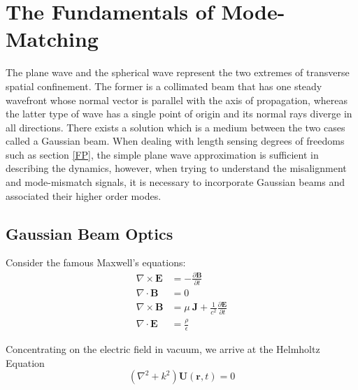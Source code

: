 \chapter{The Fundamentals of Mode-Matching}\label{fund_mm}
	  The plane wave and the spherical wave represent the two extremes of transverse spatial confinement. The former is a collimated beam that has one steady wavefront whose normal vector is parallel with the axis of propagation, whereas the latter type of wave has a single point of origin and its normal rays diverge in all directions.  There exists a solution which is a medium between the two cases called a Gaussian beam.  When dealing with length sensing degrees of freedoms such as section \ref{FP}, the simple plane wave approximation is sufficient in describing the dynamics, however, when trying to understand the misalignment and mode-mismatch signals, it is necessary to incorporate Gaussian beams and associated their higher order modes.
		\section{Gaussian Beam Optics}
		Consider the famous Maxwell's equations:
		\begin{equation}
		\label{18.1:1}
		\begin{aligned}
		 \nabla \times \mathbf{E} &=-\frac{\partial \mathbf{B}} {\partial t}
		\\\nabla \cdot \mathbf{B} &=0				
		\\\nabla \times \mathbf{B} &= \mu\ \mathbf{J} + \frac{1}{c^2} \frac{\partial \mathbf{E}} {\partial t}
		\\
		\nabla \cdot \mathbf{E} &= \frac{\rho}{\epsilon}
		\end{aligned}
		\end{equation}
		
		Concentrating on the electric field in vacuum, we arrive at the Helmholtz Equation
		\begin{equation}\label{Helmholtz}
		(\nabla^2 + k^2 ) \mathbf{U}(\mathbf{r},t) = 0
		\end{equation}
		
